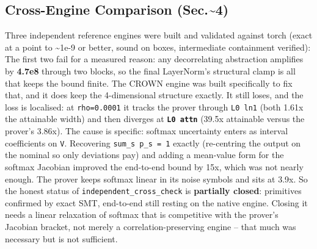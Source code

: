 \documentclass[10pt,journal]{IEEEtran}
\begin{document}
\subsection{Cross-Engine Comparison (Sec.\textasciitilde{}4)}
\label{sec:crossengine}
Three independent reference engines were built and validated against torch (exact at a point to \textasciitilde{}1e-9 or better, sound on boxes, intermediate containment verified):
The first two fail for a measured reason: any decorrelating abstraction amplifies by \textbf{4.7e8} through two blocks, so the final LayerNorm's structural clamp is all that keeps the bound finite.
The CROWN engine was built specifically to fix that, and it does keep the 4-dimensional structure exactly. It still loses, and the loss is localised: at \texttt{rho=0.0001} it tracks the prover through \texttt{L0 ln1} (both 1.61x the attainable width) and then diverges at \textbf{\texttt{L0 attn}} (39.5x attainable versus the prover's 3.86x).
The cause is specific: softmax uncertainty enters as interval coefficients on \texttt{V}. Recovering \texttt{sum\_s p\_s = 1} exactly (re-centring the output on the nominal so only deviations pay) and adding a mean-value form for the softmax Jacobian improved the end-to-end bound by 15x, which was not nearly enough. The prover keeps softmax linear in its noise symbols and sits at 3.9x.
So the honest status of \texttt{independent\_cross\_check} is \textbf{partially closed}: primitives confirmed by exact SMT, end-to-end still resting on the native engine. Closing it needs a linear relaxation of softmax that is competitive with the prover's Jacobian bracket, not merely a correlation-preserving engine -- that much was necessary but is not sufficient.
\end{document}

